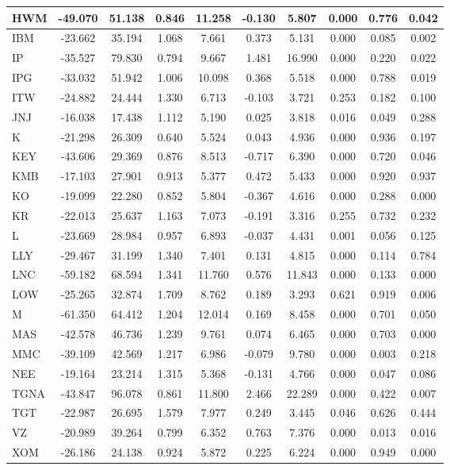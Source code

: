 \begin{table}
\begin{tabular}{l|c|c|c|c|c|c|c|c|c}
\hline
HWM & -49.070 & 51.138 & 0.846 & 11.258 & -0.130 & 5.807 & 0.000 & 0.776 & 0.042\\
\hline
IBM & -23.662 & 35.194 & 1.068 & 7.661 & 0.373 & 5.131 & 0.000 & 0.085 & 0.002\\
\hline
IP & -35.527 & 79.830 & 0.794 & 9.667 & 1.481 & 16.990 & 0.000 & 0.220 & 0.022\\
\hline
IPG & -33.032 & 51.942 & 1.006 & 10.098 & 0.368 & 5.518 & 0.000 & 0.788 & 0.019\\
\hline
ITW & -24.882 & 24.444 & 1.330 & 6.713 & -0.103 & 3.721 & 0.253 & 0.182 & 0.100\\
\hline
JNJ & -16.038 & 17.438 & 1.112 & 5.190 & 0.025 & 3.818 & 0.016 & 0.049 & 0.288\\
\hline
K & -21.298 & 26.309 & 0.640 & 5.524 & 0.043 & 4.936 & 0.000 & 0.936 & 0.197\\
\hline
KEY & -43.606 & 29.369 & 0.876 & 8.513 & -0.717 & 6.390 & 0.000 & 0.720 & 0.046\\
\hline
KMB & -17.103 & 27.901 & 0.913 & 5.377 & 0.472 & 5.433 & 0.000 & 0.920 & 0.937\\
\hline
KO & -19.099 & 22.280 & 0.852 & 5.804 & -0.367 & 4.616 & 0.000 & 0.288 & 0.000\\
\hline
KR & -22.013 & 25.637 & 1.163 & 7.073 & -0.191 & 3.316 & 0.255 & 0.732 & 0.232\\
\hline
L & -23.669 & 28.984 & 0.957 & 6.893 & -0.037 & 4.431 & 0.001 & 0.056 & 0.125\\
\hline
LLY & -29.467 & 31.199 & 1.340 & 7.401 & 0.131 & 4.815 & 0.000 & 0.114 & 0.784\\
\hline
LNC & -59.182 & 68.594 & 1.341 & 11.760 & 0.576 & 11.843 & 0.000 & 0.133 & 0.000\\
\hline
LOW & -25.265 & 32.874 & 1.709 & 8.762 & 0.189 & 3.293 & 0.621 & 0.919 & 0.006\\
\hline
M & -61.350 & 64.412 & 1.204 & 12.014 & 0.169 & 8.458 & 0.000 & 0.701 & 0.050\\
\hline
MAS & -42.578 & 46.736 & 1.239 & 9.761 & 0.074 & 6.465 & 0.000 & 0.703 & 0.000\\
\hline
MMC & -39.109 & 42.569 & 1.217 & 6.986 & -0.079 & 9.780 & 0.000 & 0.003 & 0.218\\
\hline
NEE & -19.164 & 23.214 & 1.315 & 5.368 & -0.131 & 4.766 & 0.000 & 0.047 & 0.086\\
\hline
TGNA & -43.847 & 96.078 & 0.861 & 11.800 & 2.466 & 22.289 & 0.000 & 0.422 & 0.007\\
\hline
TGT & -22.987 & 26.695 & 1.579 & 7.977 & 0.249 & 3.445 & 0.046 & 0.626 & 0.444\\
\hline
VZ & -20.989 & 39.264 & 0.799 & 6.352 & 0.763 & 7.376 & 0.000 & 0.013 & 0.016\\
\hline
XOM & -26.186 & 24.138 & 0.924 & 5.872 & 0.225 & 6.224 & 0.000 & 0.949 & 0.000\\
\hline
\end{tabular}
\end{table}
